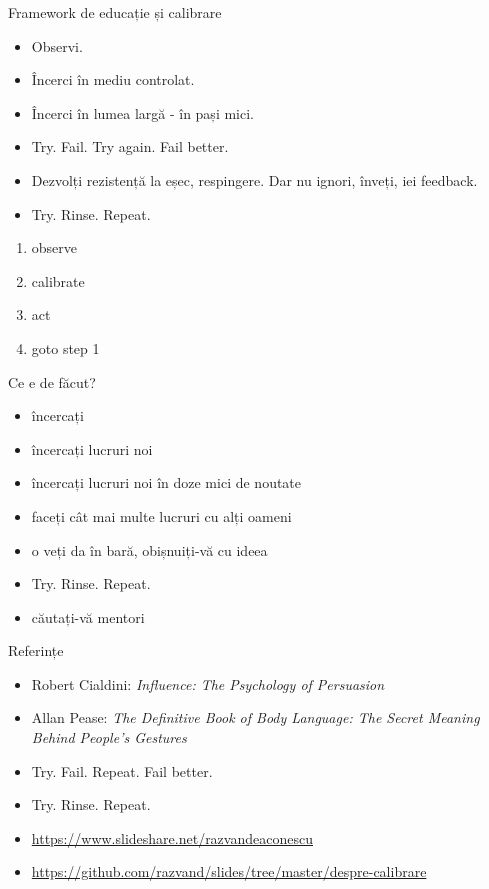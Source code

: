 \documentclass{simple}
\begin{document}
\begin{frame}{Framework de educație și calibrare}
  \begin{itemize}
    \pause \item Observi.
    \pause \item Încerci în mediu controlat.
    \pause \item Încerci în lumea largă - în pași mici.
    \pause \item Try. Fail. Try again. Fail better.
    \pause \item Dezvolți rezistență la eșec, respingere. Dar nu ignori, înveți, iei feedback.
    \pause \item Try. Rinse. Repeat.
  \end{itemize}
\end{frame}

\begin{frame}{}
  \begin{enumerate}
    \pause \item observe
    \pause \item calibrate
    \pause \item act
    \pause \item goto step 1
  \end{enumerate}
\end{frame}

\begin{frame}{Ce e de făcut?}
  \begin{itemize}
    \pause \item încercați
    \pause \item încercați lucruri noi
    \pause \item încercați lucruri noi în doze mici de noutate
    \pause \item faceți cât mai multe lucruri cu alți oameni
    \pause \item o veți da în bară, obișnuiți-vă cu ideea
    \pause \item Try. Rinse. Repeat.
    \pause \item căutați-vă mentori
  \end{itemize}
\end{frame}

\begin{frame}{Referințe}
  \begin{itemize}
    \pause \item Robert Cialdini: \textit{Influence: The Psychology of Persuasion}
    \pause \item Allan Pease: \textit{The Definitive Book of Body Language: The Secret Meaning Behind People's Gestures}
    \pause \item Try. Fail. Repeat. Fail better.
    \pause \item Try. Rinse. Repeat.
    \pause \item \url{https://www.slideshare.net/razvandeaconescu}
    \pause \item \url{https://github.com/razvand/slides/tree/master/despre-calibrare}
  \end{itemize}
\end{frame}
\end{document}
